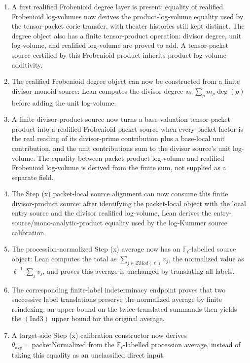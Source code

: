 \documentclass[11pt]{article}
\newcommand{\Lean}{Lean}
\newcommand{\Ind}{\ensuremath{\mathrm{Ind}}}
\theoremstyle{plain}
\theoremstyle{definition}
\theoremstyle{remark}
\begin{document}
\begin{enumerate}
  separate bridge assumption.
\item A first realified Frobenioid degree layer is present: equality of
  realified Frobenioid log-volumes now derives the product-log-volume equality
  used by the tensor-packet coric transfer, with theater histories still kept
  distinct.  The degree object also has a finite tensor-product operation:
  divisor degree, unit log-volume, and realified log-volume are proved to add.
  A tensor-packet source certified by this Frobenioid product inherits
  product-log-volume additivity.
\item The realified Frobenioid degree object can now be constructed from a
  finite divisor-monoid source: \Lean{} computes the divisor degree as
  \(\sum_p m_p\deg(p)\) before adding the unit log-volume.
\item A finite divisor-product source now turns a base-valuation tensor-packet
  product into a realified Frobenioid packet source when every packet factor is
  the real reading of its divisor-prime contribution plus a base-local unit
  contribution, and the unit contributions sum to the divisor source's unit
  log-volume.
  The equality between packet product log-volume and realified Frobenioid
  log-volume is derived from the finite sum, not supplied as a separate field.
\item The Step (x) packet-local source alignment can now consume this finite
  divisor-product source: after identifying the packet-local object with the
  local entry source and the divisor realified log-volume, \Lean{} derives the
  entry-source/mono-analytic-product equality used by the log-Kummer source
  calibration.
\item The procession-normalized Step (x) average now has an
  \(\mathbb{F}_\ell\)-labelled source object: \Lean{} computes the total as
  \(\sum_{j\in ZMod(\ell)} v_j\), the normalized value as
  \(\ell^{-1}\sum_j v_j\), and proves this average is unchanged by translating
  all labels.
\item The corresponding finite-label indeterminacy endpoint proves that two
  successive label translations preserve the normalized average by finite
  reindexing; an upper bound on the twice-translated summands then yields the
  \((\Ind3)\) upper bound for the original average.
\item A target-side Step (x) calibration constructor now derives
  \(\theta_{\mathrm{avg}}=\mathrm{packetNormalized}\) from the
  \(\mathbb{F}_\ell\)-labelled procession average, instead of taking this
  equality as an unclassified direct input.

\end{enumerate}
\end{document}
